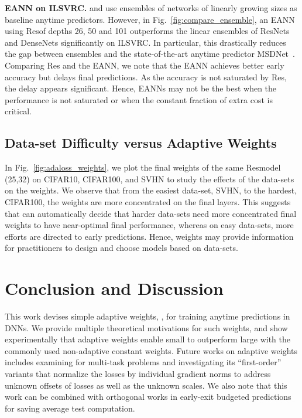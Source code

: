 \textbf{EANN on ILSVRC.}
\cite{msdense} and \cite{feedbacknet} use ensembles of networks of linearly growing sizes as baseline anytime predictors. However, in Fig.~\ref{fig:compare_ensemble}, an EANN using Res\anns of depths 26, 50 and 101 outperforms the linear ensembles of ResNets and DenseNets significantly on ILSVRC.
In particular, this drastically reduces the gap between ensembles and the state-of-the-art anytime predictor MSDNet~\cite{msdense}. 
Comparing Res and the EANN, we note that the EANN achieves better early accuracy but delays final predictions. 
As the accuracy is not saturated by Res, the delay appears significant. Hence, EANNs may not be the best when the performance is not saturated or when the constant fraction of extra cost is critical. 


\subsection{Data-set Difficulty versus Adaptive Weights}
\label{sec:weight_vs_dataset}



In Fig.~\ref{fig:adaloss_weights}, we plot the final \adaloss weights of the same Res\ann model (25,32) on CIFAR10, CIFAR100, and SVHN to study the effects of the data-sets on the weights. We observe that from the easiest data-set, SVHN, to the hardest, CIFAR100, the weights are more concentrated on the final layers. This suggests that \adaloss can automatically decide that harder data-sets need more concentrated final weights to have near-optimal final performance, whereas on easy data-sets, more efforts are directed to early predictions. Hence, \adaloss weights may provide information for practitioners to design and choose models based on data-sets.

\section{Conclusion and Discussion}
This work devises simple adaptive weights, \adaloss, for training anytime predictions in DNNs. We provide multiple theoretical motivations for such weights, and show experimentally that adaptive weights enable small \anns to outperform large \anns with the commonly used non-adaptive constant weights. Future works on adaptive weights includes examining \adaloss for multi-task problems and investigating its ``first-order'' variants that normalize the losses by individual gradient norms to address unknown offsets of losses as well as the unknown scales. We also note that this work can be combined with orthogonal works in early-exit budgeted predictions~\cite{cascade_nn,adaptivenn} for saving average test computation. 


